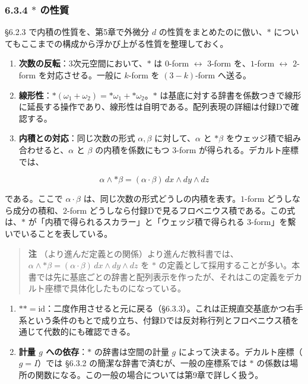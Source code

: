 \documentclass[a4paper,12pt,openany]{book}
\begin{document}
\hypertarget{ast-ux306eux6027ux8cea}{%
\subsubsection{\texorpdfstring{6.3.4 \(\ast\)
の性質}{6.3.4 \textbackslash ast の性質}}\label{ast-ux306eux6027ux8cea}}

§6.2.3 で内積の性質を、第5章で外微分 \(d\)
の性質をまとめたのに倣い、\(\ast\)
についてもここまでの構成から浮かび上がる性質を整理しておく。

\begin{enumerate}
\def\labelenumi{\arabic{enumi}.}
\item
  \textbf{次数の反転}：3次元空間において、\(\ast\) は \(0\)-form
  \(\leftrightarrow\) \(3\)-form を、\(1\)-form \(\leftrightarrow\)
  \(2\)-form を対応させる。一般に \(k\)-form を \((3-k)\)-form へ送る。
\item
  \textbf{線形性}：\(\ast(\omega_1 + \omega_2) = \ast\omega_1 + \ast\omega_2\)。\(\ast\)
  は基底に対する辞書を係数つきで線形に延長する操作であり、線形性は自明である。配列表現の詳細は付録Dで確認する。
\item
  \textbf{内積との対応}：同じ次数の形式 \(\alpha,\beta\)
  に対して、\(\alpha\) と \(\ast\beta\)
  をウェッジ積で組み合わせると、\(\alpha\) と \(\beta\)
  の内積を係数にもつ \(3\)-form が得られる。デカルト座標では、
\end{enumerate}

\[
\alpha \wedge \ast\beta
=
(\alpha\cdot\beta)\,dx\wedge dy\wedge dz
\]

である。ここで \(\alpha\cdot\beta\)
は、同じ次数の形式どうしの内積を表す。\(1\)-form
どうしなら成分の積和、\(2\)-form
どうしなら付録Dで見るフロベニウス積である。この式は、\(\ast\)
が「内積で得られるスカラー」と「ウェッジ積で得られる
\(3\)-form」を繫いでいることを表している。

\begin{quote}
\textbf{注}
（より進んだ定義との関係）より進んだ教科書では、\(\alpha\wedge\ast\beta=(\alpha\cdot\beta)\,dx\wedge dy\wedge dz\)
を \(\ast\)
の定義として採用することが多い。本書では先に基底ごとの辞書と配列表示を作ったが、それはこの定義をデカルト座標で具体化したものになっている。
\end{quote}

\begin{enumerate}
\def\labelenumi{\arabic{enumi}.}
\setcounter{enumi}{3}
\item
  \textbf{$\ast\ast = \mathrm{id}$}：二度作用させると元に戻る（§6.3.3）。これは正規直交基底かつ右手系という条件のもとで成り立ち、付録Dでは反対称行列とフロベニウス積を通じて代数的にも確認できる。
\item
  \textbf{計量 $g$ への依存}：\(\ast\) の辞書は空間の計量 \(g\)
  によって決まる。デカルト座標（\(g=I\)）では §6.3.2
  の簡潔な辞書で済むが、一般の座標系では \(\ast\)
  の係数は場所の関数になる。この一般の場合については第9章で詳しく扱う。
\end{enumerate}
\end{document}
